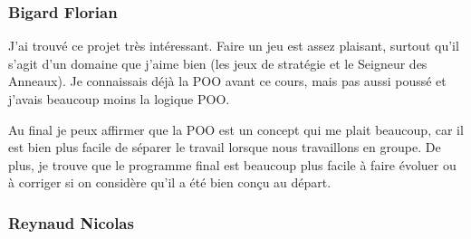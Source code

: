 \documentclass{article}
\begin{document}
  \subsubsection{Bigard Florian}
  J'ai trouvé ce projet très intéressant.
  Faire un jeu est assez plaisant, surtout qu'il s'agit d'un domaine que j'aime bien (les jeux de stratégie et le Seigneur des Anneaux).
  Je connaissais déjà la POO avant ce cours, mais pas aussi poussé et j'avais beaucoup moins la logique POO.

  Au final je peux affirmer que la POO est un concept qui me plait beaucoup, car il est bien plus facile de séparer le travail lorsque nous travaillons en groupe.
  De plus, je trouve que le programme final est beaucoup plus facile à faire évoluer ou à corriger si on considère qu'il a été bien conçu au départ.

  \subsubsection{Reynaud Nicolas}
\end{document}

